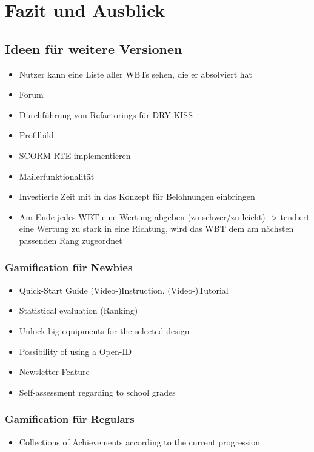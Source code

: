 \chapter{Fazit und Ausblick}\label{ref:chaptSummary}

\section{Ideen für weitere Versionen}\label{ref:weitereIdeen}
\begin{k}
\begin{itemize}
  \item Nutzer kann eine Liste aller WBTs sehen, die er absolviert hat
  \item Forum
  \item Durchführung von Refactorings für DRY KISS
  \item Profilbild
  \item SCORM RTE implementieren
  \item Mailerfunktionalität
  \item Investierte Zeit mit in das Konzept für Belohnungen einbringen
  \item Am Ende jedes WBT eine Wertung abgeben (zu schwer/zu leicht) -> tendiert
  eine Wertung zu stark in eine Richtung, wird das WBT dem am nächsten passenden
  Rang zugeordnet
\end{itemize}

\subsection{Gamification für Newbies}
\begin{itemize}
    \item Quick-Start Guide (Video-)Instruction, (Video-)Tutorial
    \item Statistical evaluation (Ranking)
    \item Unlock big equipments for the selected design
    \item Possibility of using a Open-ID
    \item Newsletter-Feature
    \item Self-assessment regarding to school grades
  \end{itemize}
  
 \subsection{Gamification für Regulars}
 \begin{itemize}
    \item Collections of Achievements according to the current progression
  \end{itemize}
  

\end{k}
